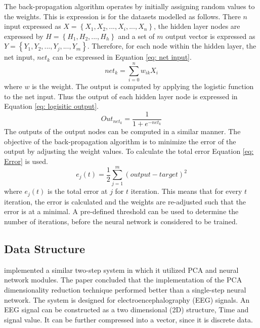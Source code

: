 \documentclass[11pt,twocolumn]{witseiepaper}
\begin{document}
	The back-propagation algorithm operates by initially assigning random values to the weights. This is expression is for the datasets modelled as follows. There $n$ input expressed as $X = \left\{X_1, X_2, ... , X_i, ..., X_n\right\}$, the hidden layer nodes are expressed by $H = \left\{H_1, H_2, ... , H_h\right\}$ and a set of $m$ output vector is expressed as $Y = \left\{Y_1, Y_2, ... , Y_j, ... , Y_m\right\}$. Therefore, for each node within the hidden layer, the net input, $net_{k}$ can be expressed in Equation \ref{eq: net input}.
	\begin{equation}
		\label{eq: net input}
		net_{k} = \sum_{i = 0}^{n} w_{ik} X_i
	\end{equation}
	where $w$ is the weight.
	\newline
	The output is computed by applying the logistic function to the net input. Thus the output of each hidden layer node is expressed in Equation \ref{eq: logisitic output}.
	\begin{equation}
		\label{eq: logisitic output}
		Out_{net_k} = \frac{1}{1 + e^{-net_k}}
	\end{equation}
	The outputs of the output nodes can be computed in a similar manner. The objective of the back-propagation algorithm is to minimize the error of the output by adjusting the weight values. To calculate the total error Equation \ref{eq: Error} is used.
	\begin{equation}
		\label{eq: Error}
		e_j(t) = \frac{1}{2} \sum_{j = 1}^{m} (output - target)^2
	\end{equation}
	where $e_j(t)$ is the total error at $j$ for $t$ iteration. 
	\newline
	This means that for every $t$ iteration, the error is calculated and the weights are re-adjusted such that the error is at a minimal. A pre-defined threshold can be used to determine the number of iterations, before the neural network is considered to be trained.
	
	\subsection{Data Structure}
	\cite{kottaimalai_eeg_2013} implemented a similar two-step system in which it utilized PCA and neural network modules. The paper concluded that the implementation of the PCA dimensionality reduction technique performed better than a single-step neural network. The system is designed for electroencephalography (EEG) signals. An EEG signal can be constructed as a two dimensional (2D) structure, Time and signal value. It can be further compressed into a vector, since it is discrete data. 
	
\end{document}
